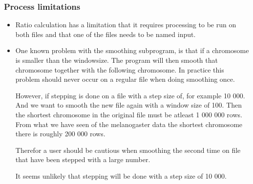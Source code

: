 \subsubsection{Process limitations}
\begin{itemize} 
\item Ratio calculation has a limitation that it requires processing to be run on both files and that one of the files needs to be named input.

\item One known problem with the smoothing subprogram, is that if a chromosome is smaller 
than the windowsize. The program will then smooth that chromosome together with 
the following chromosome. In practice this problem should never occur on a regular
file when doing smoothing once. 

However, if stepping is done on a file with a step size of, for example 10 000.
And we want to smooth the new file again with a window size of 100. Then the shortest
chromosome in the original file must be atleast 1 000 000 rows. From what we have seen
of the melanogaster data the shortest chromosome there is roughly 200 000 rows. 

Therefor a user should be cautious when smoothing the second time 
on file that have been stepped with a large number. 

It seems unlikely that stepping will be done with a step size of 10 000.  
\end{itemize}
